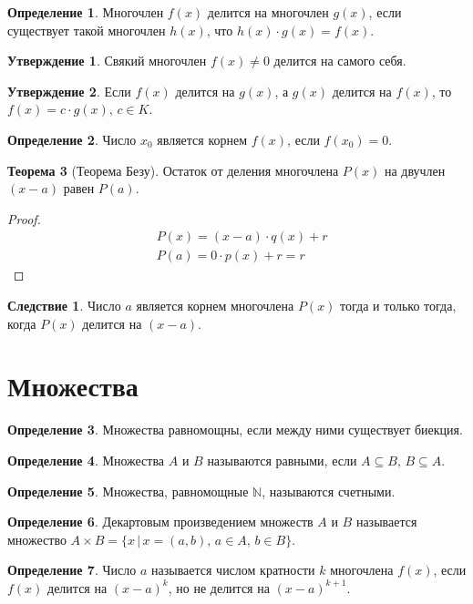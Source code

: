 \documentclass[12pt]{article}
\theoremstyle{definition}
\newtheorem{theorem}{Теорема}[section]
\newtheorem{definition}{Определение}
\newtheorem{statement}[theorem]{Утверждение}
\newtheorem{consequence}{Следствие}[subsection]
\newcommand{\N}{\mathbb{N}}
\begin{document}
\begin{definition}
    Многочлен $f(x)$ делится на многочлен $g(x)$, если существует такой многочлен $h(x)$, что $h(x)\cdot g(x)=f(x)$.
\end{definition}
\begin{statement}
    Свякий многочлен $f(x)\neq0$ делится на самого себя.
\end{statement}
\begin{statement}
    Если $f(x)$ делится на $g(x)$, а $g(x)$ делится на $f(x)$, то $f(x)=c\cdot g(x),\,c\in K$.
\end{statement}
\begin{definition}
    Число $x_0$ является корнем $f(x)$, если $f(x_0)=0$.
\end{definition}
\begin{theorem}[Теорема Безу]
    Остаток от деления многочлена $P(x)$ на двучлен $(x-a)$ равен $P(a)$.
\end{theorem}
\begin{proof}
    \begin{align*}
    &P(x)=(x-a)\cdot q(x)+r\\
    &P(a)=0\cdot p(x)+r=r
\end{align*}
\end{proof}
\setcounter{subsection}{4}
\begin{consequence}
    Число $a$ является корнем многочлена $P(x)$ тогда и только тогда, когда $P(x)$ делится на $(x-a)$.
\end{consequence}

\section{Множества}
\begin{definition}
    Множества равномощны, если между ними существует биекция.
\end{definition}
\begin{definition}
    Множества $A$ и $B$ называются равными, если $A\subseteq B,\,B\subseteq A.$
\end{definition}
\begin{definition}
    Множества, равномощные $\N$, называются счетными.
\end{definition}
\begin{definition}
    Декартовым произведением множеств $A$ и $B$ называется множество $A\times B=\{x\,|\,x=(a,b),\,a\in A,\,b\in B\}$.
\end{definition}
\begin{definition}
    Число $a$ называется числом кратности $k$ многочлена $f(x)$, если $f(x)$ делится на $(x-a)^k$, но не делится на $(x-a)^{k+1}$.
\end{definition}
\end{document}
